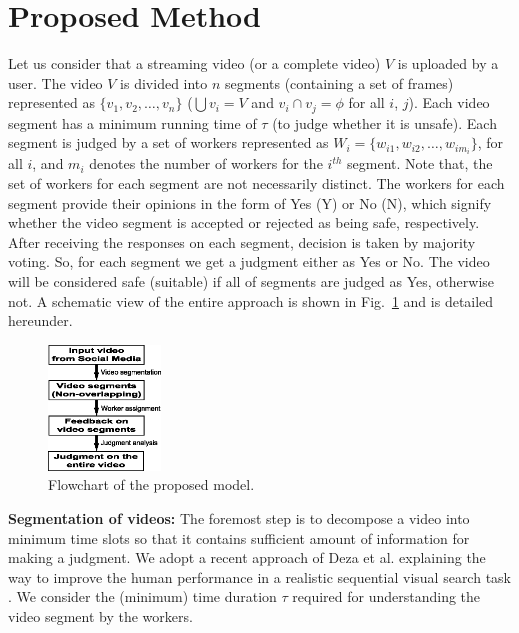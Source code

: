 \documentclass[letterpaper]{article}
\begin{document}
\section{Proposed Method}
Let us consider that a streaming video (or a complete video) $V$ is uploaded by a user. The video $V$ is divided into $n$ segments (containing a set of frames) represented as $\{v_1, v_2, \ldots, v_n\}$ ($\bigcup v_i = V$ and $v_i \cap v_j = \phi$ for all $i$, $j$). Each video segment has a minimum running time of $\tau$ (to judge whether it is unsafe). Each segment is judged by a set of workers represented as $W_i = \{w_{i1}, w_{i2}, \ldots, w_{i{m_i}}\}$, for all $i$, and $m_i$ denotes the number of workers for the $i^{th}$ segment. Note that, the set of workers for each segment are not necessarily distinct. The workers for each segment provide their opinions in the form of Yes (Y) or No (N), which signify whether the video segment is accepted or rejected as being safe, respectively. After receiving the responses on each segment, decision is taken by majority voting. So, for each segment we get a judgment either as Yes or No. The video will be considered safe (suitable) if all of segments are judged as Yes, otherwise not. A schematic view of the entire approach is shown in Fig.~\ref{Fig:Flowchart} and is detailed hereunder.

\begin{figure}[!t]
\begin{center}
\includegraphics[width=3cm]{Flowchart.eps}
\caption{Flowchart of the proposed model.}
\label{Fig:Flowchart}
\end{center}
\end{figure}

\textbf{Segmentation of videos:} The foremost step is to decompose a video into minimum time slots so that it contains sufficient amount of information for making a judgment. We adopt a recent approach of Deza et al. explaining the way to improve the human performance in a realistic sequential visual search task \cite{Deza2017}. We consider the (minimum) time duration $\tau$ required for understanding the video segment by the workers.
\end{document}

